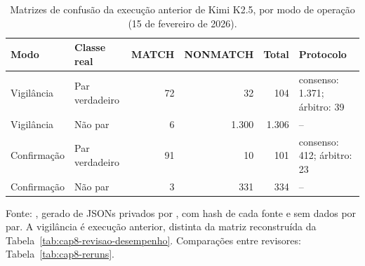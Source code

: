 \begin{table}[htbp]
\centering
\small
\caption{Matrizes de confusão da execução anterior de Kimi K2.5, por modo de operação (15 de fevereiro de 2026).}
\label{tab:qw2-confusion}
\begin{tabular}{llrrrl}
\toprule
Modo & Classe real & MATCH & NONMATCH & Total & Protocolo \\
\midrule
Vigil\^ancia & Par verdadeiro & 72 & 32 & 104 & consenso: 1.371; \'arbitro: 39 \\
Vigil\^ancia & N\~ao par & 6 & 1.300 & 1.306 & -- \\ \midrule
Confirma\c{c}\~ao & Par verdadeiro & 91 & 10 & 101 & consenso: 412; \'arbitro: 23 \\
Confirma\c{c}\~ao & N\~ao par & 3 & 331 & 334 & -- \\
\bottomrule
\end{tabular}
\par\smallskip\parbox{\linewidth}{\footnotesize Fonte: , gerado de JSONs privados por , com hash de cada fonte e sem dados por par. A vigilância é execução anterior, distinta da matriz reconstruída da Tabela~\ref{tab:cap8-revisao-desempenho}. Comparações entre revisores: Tabela~\ref{tab:cap8-reruns}.}
\end{table}
